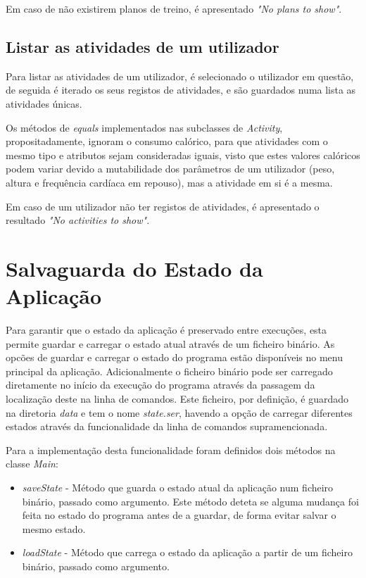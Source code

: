 \documentclass[a4paper,12pt]{scrreprt}
\begin{document}
        Em caso de não existirem planos de treino, é apresentado \textit{"No plans to show"}.

    \subsection{Listar as atividades de um utilizador}
        Para listar as atividades de um utilizador, é selecionado o utilizador em questão,
        de seguida é iterado os seus registos de atividades,
        e são guardados numa lista as atividades únicas.

        Os métodos de \textit{equals} implementados nas subclasses de \textit{Activity}, propositadamente,
        ignoram o consumo calórico, para que atividades com o mesmo tipo e atributos sejam consideradas iguais,
        visto que estes valores calóricos podem variar devido a mutabilidade dos parâmetros de um utilizador
        (peso, altura e frequência cardíaca em repouso), mas a atividade em si é a mesma.

        Em caso de um utilizador não ter registos de atividades, é apresentado o resultado \textit{"No activities to show"}.

\clearpage
\section{Salvaguarda do Estado da Aplicação}
    \label{sec:salvaguarda-estado}
Para garantir que o estado da aplicação é preservado entre execuções, esta
permite guardar e carregar o estado atual através de um ficheiro binário.
As opcões de guardar e carregar o estado do programa estão disponíveis no menu principal da aplicação. Adicionalmente o ficheiro binário pode ser carregado diretamente no início da execução do programa através da passagem da localização deste na linha de comandos.
Este ficheiro, por definição, é guardado na diretoria \textit{data} e tem o nome \textit{state.ser}, havendo a opção de carregar diferentes estados através da funcionalidade da linha de comandos supramencionada.

Para a implementação desta funcionalidade foram definidos dois métodos na classe \textit{Main}:
\begin{itemize}
    \item \textit{saveState} - Método que guarda o estado atual da aplicação num ficheiro binário, passado como argumento. Este método deteta se alguma mudança foi feita no estado do programa antes de a guardar, de forma evitar salvar o mesmo estado.
    \item \textit{loadState} - Método que carrega o estado da aplicação a partir de um ficheiro binário, passado como argumento.
\end{itemize}
\end{document}
